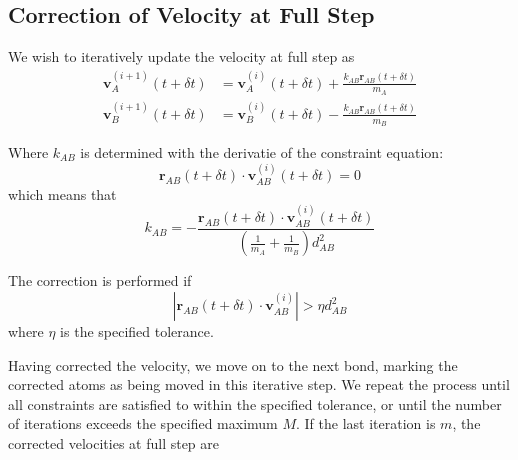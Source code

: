 \subsection{Correction of Velocity at Full Step}
\label{sec:rattle-correct-2}
\par We wish to iteratively update the velocity at full step as 
\begin{equation}
\label{eq:rattle-update-2}
\begin{aligned}
	\mathbf{v}_A^{(i + 1)}(t + \delta t) &= \mathbf{v}_A^{(i)}(t + \delta t) + \frac{ k_{AB} \mathbf{r}_{AB} (t + \delta t) }{m_A} \\
	\mathbf{v}_B^{(i + 1)}(t + \delta t) &= \mathbf{v}_B^{(i)}(t + \delta t) - \frac{ k_{AB} \mathbf{r}_{AB} (t + \delta t) }{m_B} 
\end{aligned}
\end{equation}
\par Where $k_{AB}$ is determined with the derivatie of the constraint equation:
\begin{equation*}	
	\mathbf{r}_{AB}(t + \delta t) \cdot \mathbf{v}_{AB}^{(i)}(t + \delta t) = 0
\end{equation*}
which means that 
\begin{equation*}
	k_{AB} = - \frac{ \mathbf{r}_{AB}(t + \delta t) \cdot \mathbf{v}_{AB}^{(i)}(t + \delta t) }{ (\frac{1}{m_A} + \frac{1}{m_B}) d_{AB}^2 }
\end{equation*}
\par The correction is performed if 
\begin{equation*}
	\left| \mathbf{r}_{AB}(t + \delta t) \cdot \mathbf{v}_{AB}^{(i)} \right| > \eta d_{AB}^2
\end{equation*}
where $\eta$ is the specified tolerance.
\par Having corrected the velocity, we move on to the next bond, marking the corrected atoms as being moved in this iterative step. We repeat the process until all constraints are satisfied to within the specified tolerance, or until the number of iterations exceeds the specified maximum $M$. If the last iteration is $m$, the corrected velocities at full step are
